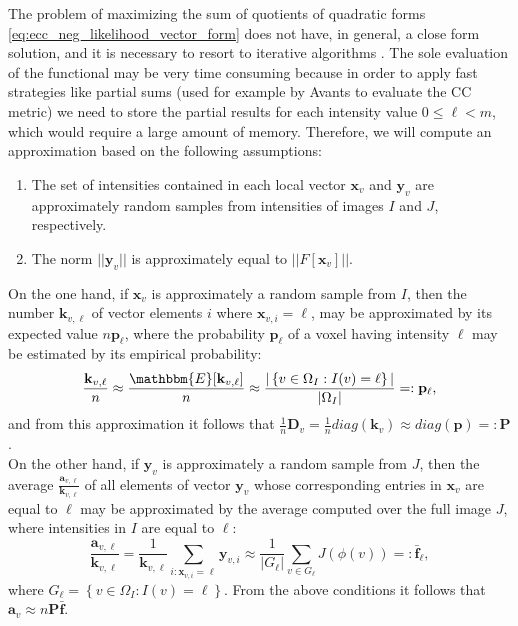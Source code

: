 The problem of maximizing the sum of quotients of quadratic forms \eqref{eq:ecc_neg_likelihood_vector_form} does not have, in general, a close form solution, and it is necessary to resort to iterative algorithms \cite{Kiers1995}. The sole evaluation of the functional may be very time consuming because in order to apply fast strategies like partial sums (used for example by Avants \cite{Avants2011} to evaluate the CC metric) we need to store the partial results for each intensity value $0 \leq \ell < m$, which would require a large amount of memory. Therefore, we will compute an approximation based on the following assumptions:
\begin{enumerate}
    \item The set of intensities contained in each local vector $\mathbf{x}_{v}$ and $\mathbf{y}_{v}$ are approximately random samples from intensities of images $I$ and $J$, respectively.
    \item The norm $||\mathbf{y}_{v}||$ is approximately equal to $||F[\mathbf{x}_{v}]||.$
\end{enumerate}
On the one hand, if $\mathbf{x}_{v}$ is approximately a random sample from $I$, then the number $\mathbf{k}_{v,\ell}$ of vector elements $i$ where $\mathbf{x}_{v,i} = \ell$, may be approximated by its expected value $n\mathbf{p}_{\ell}$, where the probability $\mathbf{p}_{\ell}$ of a voxel having intensity $\ell$ may be estimated by its empirical probability:
\begin{equation}
    \frac{\mathbf{k}_{v, \ell}}{n} \approx \frac{\mathbbm{E}[\mathbf{k}_{v,\ell}]}{n} \approx \frac{|\left\lbrace v\in\Omega_{I} : I(v) = \ell\right\rbrace|}{|\Omega_{I}|} =: \mathbf{p}_{\ell},
\end{equation}
and from this approximation it follows that $\frac{1}{n}\mathbf{D}_{v} = \frac{1}{n}diag(\mathbf{k}_{v}) \approx diag(\mathbf{p}) =: \mathbf{P}$.\\

On the other hand, if $\mathbf{y}_{v}$ is approximately a random sample from $J$, then the average $\frac{\mathbf{a}_{v,\ell}}{\mathbf{k}_{v,\ell}}$ of all elements of vector $\mathbf{y}_{v}$ whose corresponding entries in $\mathbf{x}_{v}$ are equal to $\ell$ may be approximated by the average computed over the full image $J$, where intensities in $I$ are equal to $\ell$:
\begin{equation}\label{eq:average_of_isosets}
    \frac{\mathbf{a}_{v,\ell}}{\mathbf{k}_{v,\ell}} =  \frac{1}{\mathbf{k}_{v,\ell}}\sum_{i:\mathbf{x}_{v,i}=\ell} \mathbf{y}_{v,i} \approx \frac{1}{|G_{\ell}|}\sum_{v\in G_{\ell}} J(\phi(v))
    =:\bar{\mathbf{f}}_{\ell},
\end{equation}
where $G_{\ell} = \left\lbrace v\in \Omega_{I}: I(v) = \ell\right\rbrace$. From the above conditions it follows that $\mathbf{a}_{v} \approx n \mathbf{P} \mathbf{\bar{f}}$.\\

